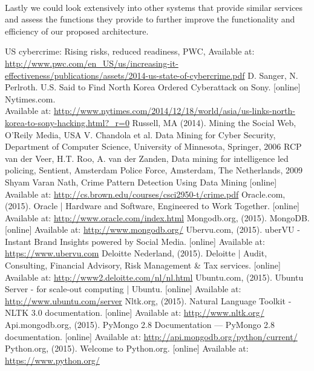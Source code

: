 \documentclass[12pt]{article}
\begin{document}
\hfill \break\\
\parbox{\linewidth}{
Lastly we could look extensively into other systems that provide similar services and assess the functions they provide to further improve the functionality and efficiency of our proposed architecture.
}
\newpage
\begin{thebibliography}{99}
US cybercrime: Rising risks, reduced readiness, PWC, Available at: \url{http://www.pwc.com/en_US/us/increasing-it-effectiveness/publications/assets/2014-us-state-of-cybercrime.pdf}
	 D. Sanger, N. Perlroth.  U.S. Said to Find North Korea Ordered Cyberattack on Sony. [online] Nytimes.com. \\Available at: \url{http://www.nytimes.com/2014/12/18/world/asia/us-links-north-korea-to-sony-hacking.html?_r=0}
  Russell, MA (2014). Mining the Social Web, O'Reily Media, USA
    V. Chandola et al. Data Mining for Cyber Security, Department of Computer Science, University of Minnesota, Springer, 2006
   RCP van der Veer, H.T. Roo,  A. van der Zanden, Data mining for intelligence led policing, Sentient, Amsterdam Police Force, Amsterdam, The Netherlands, 2009
Shyam Varan Nath, Crime Pattern Detection Using Data Mining [online] Available at: \url{http://cs.brown.edu/courses/csci2950-t/crime.pdf} 
Oracle.com, (2015). Oracle | Hardware and Software, Engineered to Work Together. [online] Available at: \url{http://www.oracle.com/index.html}
Mongodb.org, (2015). MongoDB. [online] Available at: \url{http://www.mongodb.org/} 
Ubervu.com, (2015). uberVU - Instant Brand Insights powered by Social Media. [online] Available at: \url{https://www.ubervu.com}
Deloitte Nederland, (2015). Deloitte | Audit, Consulting, Financial Advisory, Risk Management \& Tax services. [online] Available at: \url{http://www2.deloitte.com/nl/nl.html}
Ubuntu.com, (2015). Ubuntu Server - for scale-out computing | Ubuntu. [online] Available at: \url{http://www.ubuntu.com/server}
Nltk.org, (2015). Natural Language Toolkit - NLTK 3.0 documentation. [online] Available at: \url{http://www.nltk.org/}
Api.mongodb.org, (2015). PyMongo 2.8 Documentation — PyMongo 2.8 documentation. [online] Available at: \url{http://api.mongodb.org/python/current/}
Python.org, (2015). Welcome to Python.org. [online] Available at: \url{https://www.python.org/}

\end{thebibliography}
\end{document}
